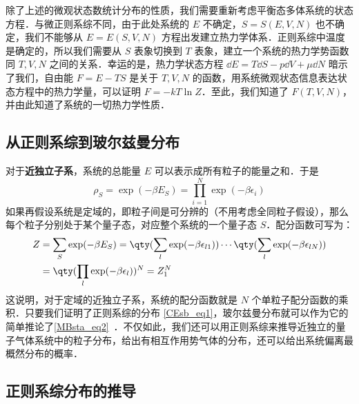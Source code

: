 除了上述的微观状态数统计分布的性质，我们需要重新考虑平衡态多体系统的状态方程．与微正则系综不同，由于此处系统的 $E$ 不确定，$S=S(E,V,N)$ 也不确定，我们不能够从 $E=E(S,V,N)$ 方程出发建立热力学体系．正则系综中温度是确定的，所以我们需要从 $S$ 表象切换到 $T$ 表象，建立一个系统的热力学势函数同 $T,V,N$ 之间的关系．幸运的是，热力学状态方程 $\dd E=T\dd S-p\dd V+\mu\dd N$ 暗示了我们，自由能 $F=E-TS$ 是关于 $T,V,N$ 的函数，用系统微观状态信息表达状态方程中的热力学量，可以证明 $F=-kT\ln Z$．至此，我们知道了 $F(T,V,N)$，并由此知道了系统的一切热力学性质．

\subsection{从正则系综到玻尔兹曼分布}
对于\textbf{近独立子系}，系统的总能量 $E$ 可以表示成所有粒子的能量之和．于是
\begin{equation}
\rho_S=\exp(-\beta E_S)=\prod_{i=1}^N\exp(-\beta\epsilon_i)
\end{equation}
如果再假设系统是定域的，即粒子间是可分辨的（不用考虑全同粒子假设），那么每个粒子分别处于某个量子态，对应整个系统的一个量子态 $S$．配分函数可写为：
\begin{equation}
\begin{aligned}
Z&=\sum_S\exp(-\beta E_S)=\qty(\sum_{l}\exp(-\beta\epsilon_{l1}))\cdots\qty(\sum_{l}\exp(-\beta\epsilon_{lN}))\\
&=\qty(\prod_{l}\exp(-\beta\epsilon_{l}))^N=Z_1^N
\end{aligned}
\end{equation}
这说明，对于定域的近独立子系，系统的配分函数就是 $N$ 个单粒子配分函数的乘积．只要我们证明了正则系综的分布 \autoref{CEsb_eq1}，玻尔兹曼分布就可以作为它的简单推论了\autoref{MBsta_eq2}~．不仅如此，我们还可以用正则系综来推导近独立的量子气体系统中的粒子分布，给出有相互作用势气体的分布，还可以给出系统偏离最概然分布的概率．
\subsection{正则系综分布的推导}
